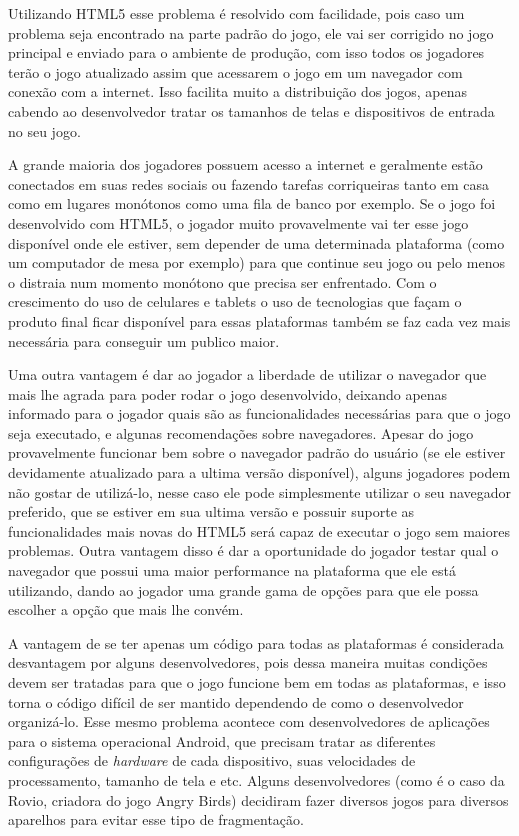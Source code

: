Utilizando HTML5 esse problema é resolvido com facilidade, pois caso
um problema seja encontrado na parte padrão do jogo, ele vai ser
corrigido no jogo principal e enviado para o ambiente de produção, com
isso todos os jogadores terão o jogo atualizado assim que acessarem o
jogo em um navegador com conexão com a internet. Isso facilita muito a
distribuição dos jogos, apenas cabendo ao desenvolvedor tratar os
tamanhos de telas e dispositivos de entrada no seu jogo.

A grande maioria dos jogadores possuem acesso a internet e geralmente
estão conectados em suas redes sociais ou fazendo tarefas corriqueiras
tanto em casa como em lugares monótonos como uma fila de banco por
exemplo. Se o jogo foi desenvolvido com HTML5, o jogador muito
provavelmente vai ter esse jogo disponível onde ele estiver, sem
depender de uma determinada plataforma (como um computador de mesa por
exemplo) para que continue seu jogo ou pelo menos o distraia num
momento monótono que precisa ser enfrentado. Com o crescimento do uso
de celulares e tablets o uso de tecnologias que façam o produto final
ficar disponível para essas plataformas também se faz cada vez mais
necessária para conseguir um publico maior.

Uma outra vantagem é dar ao jogador a liberdade de utilizar o
navegador que mais lhe agrada para poder rodar o jogo desenvolvido,
deixando apenas informado para o jogador quais são as funcionalidades
necessárias para que o jogo seja executado, e algunas recomendações
sobre navegadores. Apesar do jogo provavelmente funcionar bem sobre o
navegador padrão do usuário (se ele estiver devidamente atualizado
para a ultima versão disponível), alguns jogadores podem não gostar de
utilizá-lo, nesse caso ele pode simplesmente utilizar
o seu navegador preferido, que se estiver em sua ultima
versão e possuir suporte as funcionalidades mais novas do HTML5 será
capaz de executar o jogo sem maiores problemas. Outra vantagem disso é
dar a oportunidade do jogador testar qual o navegador que possui uma
maior performance na plataforma que ele está utilizando, dando ao
jogador uma grande gama de opções para que ele possa escolher a opção
que mais lhe convém.

A vantagem de se ter apenas um código para todas as plataformas é
considerada desvantagem por alguns desenvolvedores, pois dessa maneira
muitas condições devem ser tratadas para que o jogo funcione bem em
todas as plataformas, e isso torna o código difícil de ser mantido
dependendo de como o desenvolvedor organizá-lo.
Esse mesmo problema acontece com desenvolvedores de aplicações para o
sistema operacional Android, que precisam tratar as diferentes
configurações de \textit{hardware} de cada dispositivo, suas
velocidades de processamento, tamanho de tela e etc. Alguns
desenvolvedores (como é o caso da Rovio, criadora do jogo Angry Birds)
decidiram fazer diversos jogos para diversos aparelhos para evitar
esse tipo de fragmentação.

